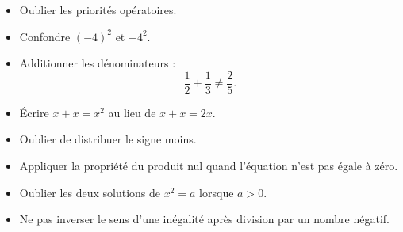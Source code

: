 \documentclass[11pt,a4paper]{article}
\begin{document}
\begin{tcolorbox}[colframe=rouge,colback=red!3!white,title=Erreurs classiques à éviter]
\begin{itemize}
  \item Oublier les priorités opératoires.
  \item Confondre $(-4)^2$ et $-4^2$.
  \item Additionner les dénominateurs :
  \[
  \frac12+\frac13\neq\frac25.
  \]
  \item Écrire $x+x=x^2$ au lieu de $x+x=2x$.
  \item Oublier de distribuer le signe moins.
  \item Appliquer la propriété du produit nul quand l'équation n'est pas égale à zéro.
  \item Oublier les deux solutions de $x^2=a$ lorsque $a>0$.
  \item Ne pas inverser le sens d'une inégalité après division par un nombre négatif.
\end{itemize}
\end{tcolorbox}
\end{document}
